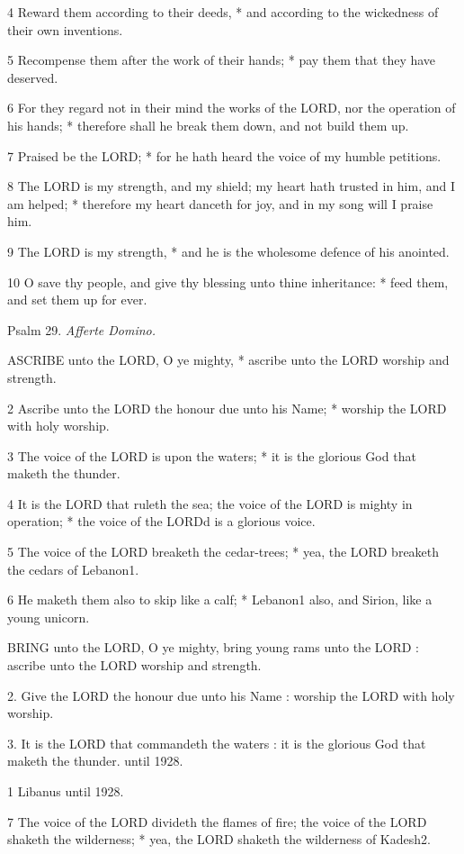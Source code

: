 4 Reward them according to their deeds, * and according
to the wickedness of their own inventions.

5 Recompense them after the work of their hands; *
pay them that they have deserved.

6 For they regard not in their mind the works of the
LORD, nor the operation of his hands; * therefore
shall he break them down, and not build them up.

7 Praised be the LORD; * for
he hath heard the voice of my humble petitions.

8 The LORD is my strength, and
my shield; my heart hath trusted in him, and I am helped; * therefore
my heart danceth for joy, and in my song will I praise him.

9 The LORD is my strength, *
and he is the wholesome defence of his anointed.

10 O save thy people, and give thy blessing unto thine
inheritance: * feed them, and set them up for ever.

Psalm
29. \emph{Afferte Domino.}

ASCRIBE
unto the LORD, O ye mighty, * ascribe unto the
LORD worship and strength.

2 Ascribe unto the LORD the
honour due unto his Name; * worship the LORD with
holy worship.

3 The voice of the LORD is upon
the waters; * it is the glorious God that maketh the thunder.

4 It is the LORD that ruleth
the sea; the voice of the LORD is mighty in operation;
* the voice of the LORDd is a glorious voice.

5 The voice of the LORD breaketh
the cedar-trees; * yea, the LORD breaketh the cedars
of Lebanon1.

6 He maketh them also to skip like a calf; * Lebanon1
also, and Sirion, like a young unicorn.

BRING unto the LORD,
O ye mighty, bring young rams unto the LORD : ascribe
unto the LORD worship and strength.

2. Give the LORD the honour
due unto his Name : worship the LORD with holy
worship.

3. It is the LORD that commandeth
the waters : it is the glorious God that maketh the thunder. until
1928.

1 Libanus until
1928.

7 The voice of the LORD divideth
the flames of fire; the voice of the LORD shaketh
the wilderness; * yea, the LORD shaketh the wilderness
of Kadesh2.

